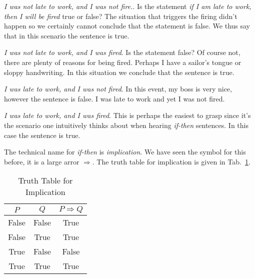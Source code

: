             \par\hfill\par
            \textit{I was not late to work, and I was not fire.}. Is the
            statement \textit{if I am late to work, then I will be fired}
            true or false? The situation that triggers the firing didn't happen
            so we certainly cannot conclude that the statement is false. We
            thus say that in this scenario the sentence is true.
            \par\hfill\par
            \textit{I was not late to work, and I was fired}. Is the statement
            false? Of course not, there are plenty of reasons for being fired.
            Perhaps I have a sailor's tongue or sloppy handwriting. In this
            situation we conclude that the sentence is true.
            \par\hfill\par
            \textit{I was late to work, and I was not fired}. In this event, my
            boss is very nice, however the sentence is false. I was late to work
            and yet I was not fired.
            \par\hfill\par
            \textit{I was late to work, and I was fired}. This is perhaps the
            easiest to grasp since it's the scenario one intuitively thinks
            about when hearing \textit{if-then} sentences. In this case the
            sentence is true.
            \par\hfill\par
            The technical name for \textit{if-then} is \textit{implication}. We
            have seen the symbol for this before, it is a large arror
            $\Rightarrow$. The truth table for implication is given in
            Tab.~\ref{tab:truth_table_implication}.
            \begin{table}
                \centering
                \begin{tabular}{c | c | c}
                    $P$&$Q$&$P\Rightarrow{Q}$\\
                    \hline
                    False&False&True\\
                    \hline
                    False&True&True\\
                    \hline
                    True&False&False\\
                    \hline
                    True&True&True
                \end{tabular}
                \caption{Truth Table for Implication}
                \label{tab:truth_table_implication}
            \end{table}
